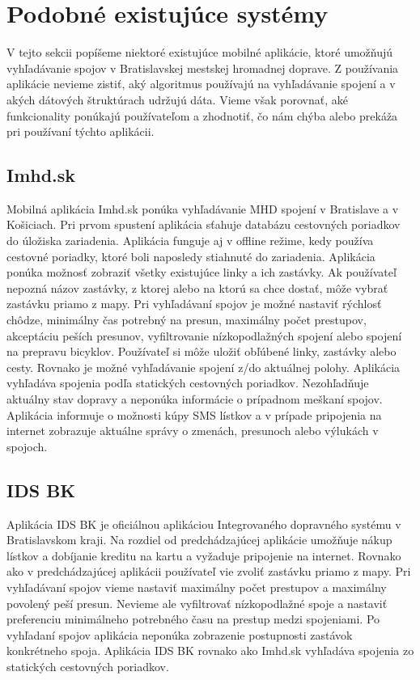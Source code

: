 \section{Podobné existujúce systémy}
\label{sec:applications}
V tejto sekcii popíšeme niektoré existujúce mobilné aplikácie, ktoré umožňujú vyhľadávanie spojov v Bratislavskej mestskej hromadnej doprave. Z používania aplikácie nevieme zistiť, aký algoritmus používajú na vyhľadávanie spojení a v akých dátových štruktúrach udržujú dáta. Vieme však porovnať, aké funkcionality ponúkajú používateľom a zhodnotiť, čo nám chýba alebo prekáža pri používaní týchto aplikácii.

\subsection{Imhd.sk}
Mobilná aplikácia Imhd.sk ponúka vyhľadávanie MHD spojení v Bratislave a v Košiciach. Pri prvom spustení aplikácia sťahuje databázu cestovných poriadkov do úložiska zariadenia. Aplikácia funguje aj v offline režime, kedy používa cestovné poriadky, ktoré boli naposledy stiahnuté do zariadenia. Aplikácia ponúka možnosť zobraziť všetky existujúce linky a ich zastávky. Ak používateľ nepozná názov zastávky, z ktorej alebo na ktorú sa chce dostať, môže vybrať zastávku priamo z mapy. Pri vyhľadávaní spojov je možné nastaviť rýchlosť chôdze, minimálny čas potrebný na presun, maximálny počet prestupov, akceptáciu peších presunov, vyfiltrovanie nízkopodlažných spojení alebo spojení na prepravu bicyklov. Používateľ si môže uložiť obľúbené linky, zastávky alebo cesty. Rovnako je možné vyhľadávanie spojení z/do aktuálnej polohy. Aplikácia vyhľadáva spojenia podľa statických cestovných poriadkov. Nezohľadňuje aktuálny stav dopravy a neponúka informácie o prípadnom meškaní spojov. Aplikácia informuje o možnosti kúpy SMS lístkov a v prípade pripojenia na internet zobrazuje aktuálne správy o zmenách, presunoch alebo výlukách v spojoch.  

\subsection{IDS BK}
Aplikácia IDS BK je oficiálnou aplikáciou Integrovaného dopravného systému v Bratislavskom kraji. Na rozdiel od predchádzajúcej aplikácie umožňuje nákup lístkov a dobíjanie kreditu na kartu a vyžaduje pripojenie na internet. Rovnako ako v predchádzajúcej aplikácii používateľ vie zvoliť zastávku priamo z mapy. Pri vyhľadávaní spojov vieme nastaviť maximálny počet prestupov a maximálny povolený peší presun. Nevieme ale vyfiltrovať nízkopodlažné spoje a nastaviť preferenciu minimálneho potrebného času na prestup medzi spojeniami. Po vyhľadaní spojov aplikácia neponúka zobrazenie postupnosti zastávok konkrétneho spoja. Aplikácia IDS BK rovnako ako Imhd.sk vyhľadáva spojenia zo statických cestovných poriadkov.  


